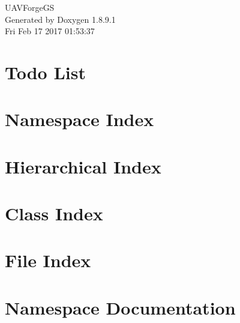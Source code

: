 \documentclass[twoside]{book}
\newcommand{\+}{\discretionary{\mbox{\scriptsize$\hookleftarrow$}}{}{}}
\newcommand{\clearemptydoublepage}{%
  \newpage{\pagestyle{empty}\cleardoublepage}%
}
\begin{document}
\hypersetup{pageanchor=false,
             bookmarks=true,
             bookmarksnumbered=true,
             pdfencoding=unicode
            }
\begin{titlepage}
\vspace*{7cm}
\begin{center}%
{\Large U\+A\+V\+Forge\+G\+S }\\
\vspace*{1cm}
{\large Generated by Doxygen 1.8.9.1}\\
\vspace*{0.5cm}
{\small Fri Feb 17 2017 01:53:37}\\
\end{center}
\end{titlepage}
\clearemptydoublepage
\tableofcontents
\clearemptydoublepage
{}
\hypersetup{pageanchor=true}

\chapter{Todo List}
\label{todo}
\hypertarget{todo}{}

\chapter{Namespace Index}

\chapter{Hierarchical Index}

\chapter{Class Index}

\chapter{File Index}

\chapter{Namespace Documentation}




\end{document}
